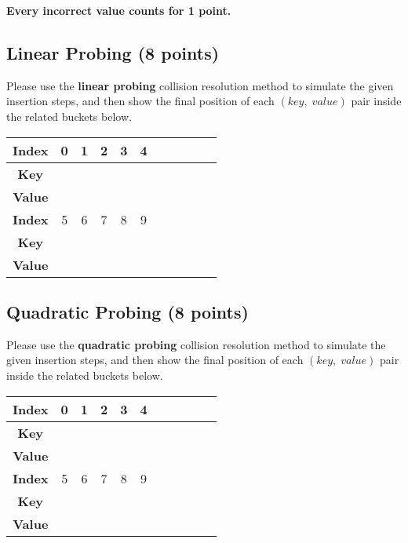 \documentclass[11pt]{exam}
\begin{document}
\textbf{Every incorrect value counts for 1 point.}
\subsection{Linear Probing (8 points)}
Please use the \textbf{linear probing} collision resolution method to simulate the given insertion steps, and then show the final position of each $(key,\;value)$ pair inside the related buckets below.
\begin{solution}
\begin{table}[H]
\centering
\renewcommand{\arraystretch}{2}
\setlength{\tabcolsep}{11mm}
\begin{tabular}{|c|c|c|c|c|c|c|c|c|c|c|}
\hline
\textbf{Index}&0&1&2&3&4\\
\hline
\textbf{Key}&&&&&\\
\hline
\textbf{Value}&&&&&\\
\hline
\textbf{Index}&5&6&7&8&9\\
\hline
\textbf{Key}&&&&&\\
\hline
\textbf{Value}&&&&&\\
\hline
\end{tabular}
\end{table}
\end{solution}

\subsection{Quadratic Probing (8 points)}
Please use the \textbf{quadratic probing} collision resolution method to simulate the given insertion steps, and then show the final position of each $(key,\;value)$ pair inside the related buckets below.
\begin{solution}
\begin{table}[H]
\centering
\renewcommand{\arraystretch}{2}
\setlength{\tabcolsep}{11mm}
\begin{tabular}{|c|c|c|c|c|c|c|c|c|c|c|}
\hline
\textbf{Index}&0&1&2&3&4\\
\hline
\textbf{Key}&&&&&\\
\hline
\textbf{Value}&&&&&\\
\hline
\textbf{Index}&5&6&7&8&9\\
\hline
\textbf{Key}&&&&&\\
\hline
\textbf{Value}&&&&&\\
\hline
\end{tabular}
\end{table}
\end{solution}
\end{document}
